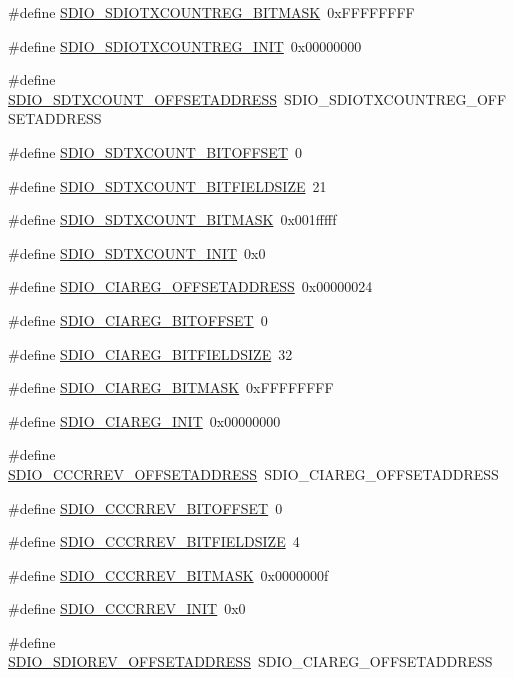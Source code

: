 \begin{DoxyCompactItemize}
\#define \hyperlink{a00571_adfec7e3d718188ca1660fba31e8d8ed5}{SDIO\_\-SDIOTXCOUNTREG\_\-BITMASK}~0xFFFFFFFF
\item 
\#define \hyperlink{a00571_aaa179d3d2a82ce6f92152515f8d25219}{SDIO\_\-SDIOTXCOUNTREG\_\-INIT}~0x00000000
\item 
\#define \hyperlink{a00571_a9391f2bdd521d696fdb6e51c879c25c0}{SDIO\_\-SDTXCOUNT\_\-OFFSETADDRESS}~SDIO\_\-SDIOTXCOUNTREG\_\-OFFSETADDRESS
\item 
\#define \hyperlink{a00571_a0c32638fe0d6cd92755adc383e21dc4c}{SDIO\_\-SDTXCOUNT\_\-BITOFFSET}~0
\item 
\#define \hyperlink{a00571_a0d77669ad18cfdb2c4695b655d1f1131}{SDIO\_\-SDTXCOUNT\_\-BITFIELDSIZE}~21
\item 
\#define \hyperlink{a00571_addb0c422ccc014506704e71a1ab41897}{SDIO\_\-SDTXCOUNT\_\-BITMASK}~0x001fffff
\item 
\#define \hyperlink{a00571_a8f86df6d02f326f35427f22a4cf3ed38}{SDIO\_\-SDTXCOUNT\_\-INIT}~0x0
\item 
\#define \hyperlink{a00571_a2d02db12efc691fbbf778669adc4a601}{SDIO\_\-CIAREG\_\-OFFSETADDRESS}~0x00000024
\item 
\#define \hyperlink{a00571_aa881a66a1e9bbd714fafcd0835219cd9}{SDIO\_\-CIAREG\_\-BITOFFSET}~0
\item 
\#define \hyperlink{a00571_a8bb86d03a43dedd115e9b60405c5b286}{SDIO\_\-CIAREG\_\-BITFIELDSIZE}~32
\item 
\#define \hyperlink{a00571_adbc066e2426365ce8a746acfb46973b4}{SDIO\_\-CIAREG\_\-BITMASK}~0xFFFFFFFF
\item 
\#define \hyperlink{a00571_a22ba756dfd7643e4d2ee3474eece83cd}{SDIO\_\-CIAREG\_\-INIT}~0x00000000
\item 
\#define \hyperlink{a00571_a3bf2b1a6e4c4d0f671814dbafdc310d0}{SDIO\_\-CCCRREV\_\-OFFSETADDRESS}~SDIO\_\-CIAREG\_\-OFFSETADDRESS
\item 
\#define \hyperlink{a00571_a5e86721e7c9940d5ce5fa231cb751a61}{SDIO\_\-CCCRREV\_\-BITOFFSET}~0
\item 
\#define \hyperlink{a00571_a6162597dae32e438ad04f0d46dee0a3a}{SDIO\_\-CCCRREV\_\-BITFIELDSIZE}~4
\item 
\#define \hyperlink{a00571_a4f94afdc11e57d86beed459215ac3acb}{SDIO\_\-CCCRREV\_\-BITMASK}~0x0000000f
\item 
\#define \hyperlink{a00571_ad170373a0f32920ed8df9cec00c9746d}{SDIO\_\-CCCRREV\_\-INIT}~0x0
\item 
\#define \hyperlink{a00571_a8961e5c63b78a8a28e9879c61ab45c1e}{SDIO\_\-SDIOREV\_\-OFFSETADDRESS}~SDIO\_\-CIAREG\_\-OFFSETADDRESS

\end{DoxyCompactItemize}
